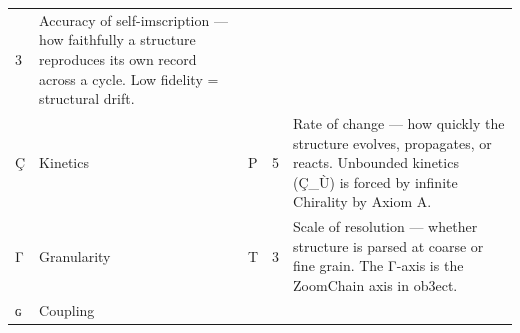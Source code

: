 \documentclass[12pt,a4paper]{article}
\begin{document}
\begin{longtable}[]{@{}lllll@{}}
\begin{minipage}[t]{0.16\columnwidth}
3\strut
\end{minipage} & \begin{minipage}[t]{0.27\columnwidth}\raggedright
Accuracy of self-imscription --- how faithfully a structure reproduces
its own record across a cycle. Low fidelity = structural drift.\strut
\end{minipage}\tabularnewline
\begin{minipage}[t]{0.14\columnwidth}\raggedright
Ç\strut
\end{minipage} & \begin{minipage}[t]{0.12\columnwidth}\raggedright
Kinetics\strut
\end{minipage} & \begin{minipage}[t]{0.16\columnwidth}\raggedright
P\strut
\end{minipage} & \begin{minipage}[t]{0.16\columnwidth}\raggedright
5\strut
\end{minipage} & \begin{minipage}[t]{0.27\columnwidth}\raggedright
Rate of change --- how quickly the structure evolves, propagates, or
reacts. Unbounded kinetics (Ç\_Ù) is forced by infinite Chirality by
Axiom A.\strut
\end{minipage}\tabularnewline
\begin{minipage}[t]{0.14\columnwidth}\raggedright
Γ\strut
\end{minipage} & \begin{minipage}[t]{0.12\columnwidth}\raggedright
Granularity\strut
\end{minipage} & \begin{minipage}[t]{0.16\columnwidth}\raggedright
T\strut
\end{minipage} & \begin{minipage}[t]{0.16\columnwidth}\raggedright
3\strut
\end{minipage} & \begin{minipage}[t]{0.27\columnwidth}\raggedright
Scale of resolution --- whether structure is parsed at coarse or fine
grain. The Γ-axis is the ZoomChain axis in ob3ect.\strut
\end{minipage}\tabularnewline
\begin{minipage}[t]{0.14\columnwidth}\raggedright
ɢ\strut
\end{minipage} & \begin{minipage}[t]{0.12\columnwidth}\raggedright
Coupling\strut
\end{minipage} & \begin{minipage}[t]{0.16\columnwidth}\raggedright

\end{minipage}
\end{longtable}
\end{document}
